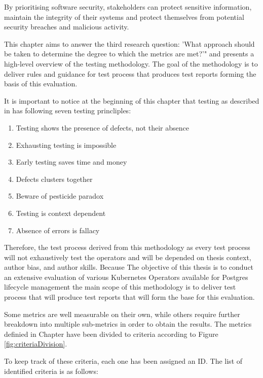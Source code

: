 By prioritising software security, stakeholders can protect sensitive information, maintain the integrity of their systems and protect themselves from potential security breaches and malicious activity.


This chapter aims to answer the third research question: 'What approach should be taken to determine the degree to which the metrics are
met?'" and presents a high-level overview of the testing methodology. The goal of the methodology is to deliver rules and guidance for test process that produces test reports forming the basis of this evaluation.

It is important to notice at the beginning of this chapter that testing as described in \cite{FoundationOfSoftwareTesting} has following seven testing princliples:
\begin{enumerate}
    \item Testing shows the presence of defects, not their absence
    \item Exhausting testing is impossible
    \item Early testing saves time and money
    \item Defects clusters together
    \item Beware of pesticide paradox
    \item Testing is context dependent
    \item Absence of errors is fallacy
\end{enumerate}



Therefore, the test process derived from this methodology as every test process will not exhaustively test the operators and will be depended on thesis context, author bias, and author skills. Because The objective of this thesis is to conduct an extensive evaluation of various Kubernetes
Operators available for Postgres lifecycle management the main scope of this methodology is to deliver test process that will produce test reports that will form the base for this evaluation.

Some metrics are well measurable on their own, while others require further breakdown into multiple sub-metrics in order to obtain the results.
The metrics definied in Chapter  have been divided to criteria according to Figure \ref{fig:criteriaDivision}.

To keep track of these criteria, each one has been assigned an ID. The list of identified criteria is as follows:

